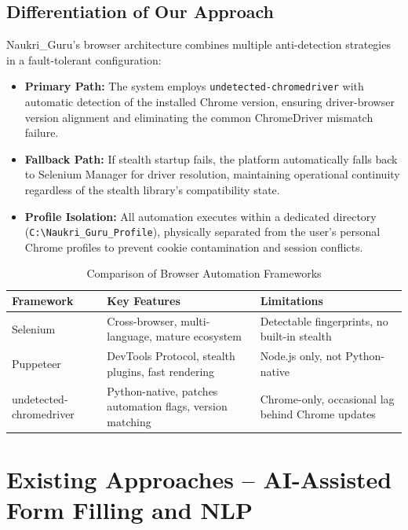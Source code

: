 \documentclass[12pt, a4paper, oneside]{report}
\begin{document}
\subsection{Differentiation of Our Approach}
Naukri\_Guru's browser architecture combines multiple anti-detection strategies in a fault-tolerant configuration:

\begin{itemize}
    \item \textbf{Primary Path:} The system employs \texttt{undetected-chromedriver} with automatic detection of the installed Chrome version, ensuring driver-browser version alignment and eliminating the common ChromeDriver mismatch failure.
    \item \textbf{Fallback Path:} If stealth startup fails, the platform automatically falls back to Selenium Manager for driver resolution, maintaining operational continuity regardless of the stealth library's compatibility state.
    \item \textbf{Profile Isolation:} All automation executes within a dedicated directory (\texttt{C:\textbackslash Naukri\_Guru\_Profile}), physically separated from the user's personal Chrome profiles to prevent cookie contamination and session conflicts.
\end{itemize}

\begin{table}[H]
\centering
\caption{Comparison of Browser Automation Frameworks}
\label{tab:cat-b-comparison}
\small
\begin{tabularx}{\textwidth}{|l|X|X|}
\hline
\textbf{Framework} & \textbf{Key Features} & \textbf{Limitations} \\
\hline
Selenium \cite{ref5} & Cross-browser, multi-language, mature ecosystem & Detectable fingerprints, no built-in stealth \\
\hline
Puppeteer \cite{ref6} & DevTools Protocol, stealth plugins, fast rendering & Node.js only, not Python-native \\
\hline
undetected-chromedriver \cite{ref7} & Python-native, patches automation flags, version matching & Chrome-only, occasional lag behind Chrome updates \\
\hline
\end{tabularx}
\end{table}

\section{Existing Approaches -- AI-Assisted Form Filling and NLP}
\label{sec:category-c}
\end{document}
